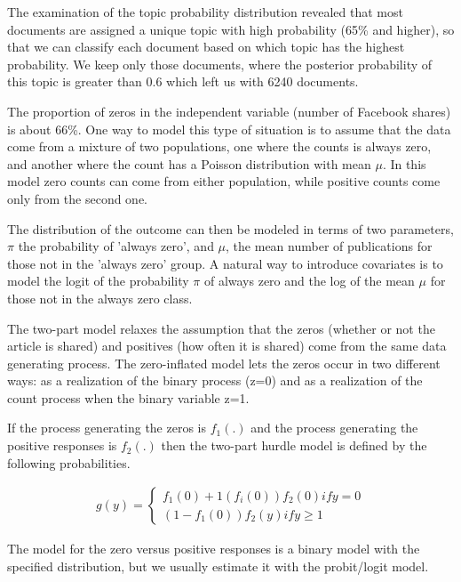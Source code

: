 \documentclass[12pt,a4paper,notitlepage]{article}
\begin{document}
The examination of the topic probability distribution revealed that most documents are assigned a unique topic with high probability (65\% and higher), so that we can classify each document based on which topic has the highest probability. We keep only those documents, where the posterior probability of this topic is greater than 0.6 which left us with 6240 documents. 

The proportion of zeros in the independent variable (number of Facebook shares) is about 66\%. One way to model this type of situation is to assume that the data come from a mixture of two populations, one where the counts is always zero, and another where the count has a Poisson distribution with mean $\mu$. In this model zero counts can come from either population, while positive counts come only from the second one. 

The distribution of the outcome can then be modeled in terms of two parameters, $\pi$ the probability of 'always zero', and $\mu$, the mean number of publications for those not in the 'always zero' group. A natural way to introduce covariates is to model the logit of the probability $\pi$ of always zero and the log of the mean $\mu$ for those not in the always zero class.

The two-part model relaxes the assumption that the zeros (whether or not the article is shared) and positives (how often it is shared) come from the same data generating process. The zero-inflated model lets the zeros occur in two different ways: as a realization of the binary process (z=0) and as a realization of the count process when the binary variable z=1. 

If the process generating the zeros is $f_1(.)$ and the process generating the positive responses is $f_2(.)$ then the two-part hurdle model is defined by the following probabilities. 

\begin{align*}
	g(y)=\begin{cases}
		f_1(0) + 1(f_i(0))f_2(0) if y=0 \\
		(1-f_1(0))f_2(y) if y\geq 1
	\end{cases}
\end{align*}

The model for the zero versus positive responses is a binary model with the specified distribution, but we usually estimate it with the probit/logit model.
\end{document}
